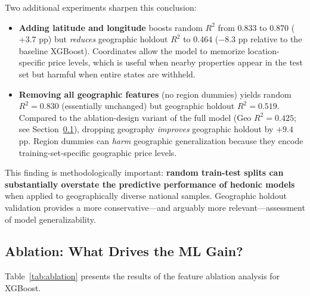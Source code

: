Two additional experiments sharpen this conclusion:
\begin{itemize}[nosep]
    \item \textbf{Adding latitude and longitude} boosts random $R^2$ from 0.833 to 0.870 ($+3.7$ pp) but \emph{reduces} geographic holdout $R^2$ to 0.464 ($-8.3$ pp relative to the baseline XGBoost). Coordinates allow the model to memorize location-specific price levels, which is useful when nearby properties appear in the test set but harmful when entire states are withheld.
    \item \textbf{Removing all geographic features} (no region dummies) yields random $R^2 = 0.830$ (essentially unchanged) but geographic holdout $R^2 = 0.519$. Compared to the ablation-design variant of the full model (Geo $R^2 = 0.425$; see Section~\ref{sec:ablation}), dropping geography \emph{improves} geographic holdout by $+9.4$ pp. Region dummies can \emph{harm} geographic generalization because they encode training-set-specific geographic price levels.
\end{itemize}

This finding is methodologically important: \textbf{random train-test splits can substantially overstate the predictive performance of hedonic models} when applied to geographically diverse national samples. Geographic holdout validation provides a more conservative---and arguably more relevant---assessment of model generalizability.


\subsection{Ablation: What Drives the ML Gain?}
\label{sec:ablation}

Table~\ref{tab:ablation} presents the results of the feature ablation analysis for XGBoost.

